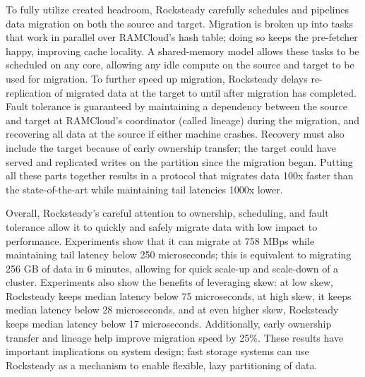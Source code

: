 To fully utilize created headroom, Rocksteady carefully schedules and
pipelines data migration on both the source and target.
%
Migration is
broken up into tasks that work in parallel over RAMCloud’s hash table;
doing so keeps the pre-fetcher happy, improving cache locality.
%
A shared-memory model allows these tasks to be scheduled on any core,
allowing any idle compute on the source and target to be used for
migration.
%
To further speed up migration, Rocksteady delays
re-replication of migrated data at the target to until after migration
has completed.
%
Fault tolerance is guaranteed by maintaining a dependency
between the source and target at RAMCloud’s coordinator (called lineage)
during the migration, and recovering all data at the source if either
machine crashes.
%
Recovery must also include the target because of early
ownership transfer; the target could have served and replicated writes
on the partition since the migration began.
%
Putting all these parts
together results in a protocol that migrates data 100x faster than the
state-of-the-art while maintaining tail latencies 1000x lower.

Overall, Rocksteady’s careful attention to ownership, scheduling, and
fault tolerance allow it to quickly and safely migrate data with low
impact to performance.
%
Experiments show that it can migrate at 758 MBps
while maintaining tail latency below 250 microseconds; this is
equivalent to migrating 256 GB of data in 6 minutes, allowing for quick
scale-up and scale-down of a cluster.
%
Experiments also show the benefits
of leveraging skew: at low skew, Rocksteady keeps median latency below
75 microseconds, at high skew, it keeps median latency below 28
microseconds, and at even higher skew, Rocksteady keeps median latency
below 17 microseconds.
%
Additionally, early ownership transfer and
lineage help improve migration speed by 25\%.
%
These results have
important implications on system design; fast storage systems can use
Rocksteady as a mechanism to enable flexible, lazy partitioning of
data.
